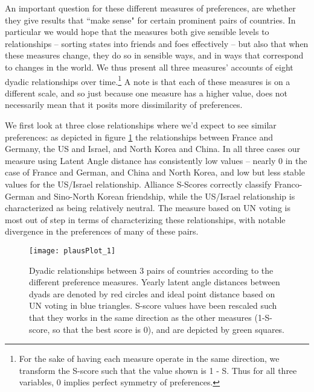 An important question for these different measures of preferences, are whether they give results that ``make sense" for certain prominent pairs of countries. In particular we would hope that the measures both give sensible levels to relationships -- sorting states into friends and foes effectively -- but also that when these measures change, they do so in sensible ways, and in ways that correspond to changes in the world. We thus present all three measures' accounts of eight dyadic relationships over time.\footnote{For the sake of having each measure operate in the same direction, we transform the S-score such that the value shown is 1 - S. Thus for all three variables, $0$ implies perfect symmetry of preferences.} A note is that each of these measures is on a different scale, and so just because one measure has a higher value, does not necessarily mean that it posits more dissimilarity of preferences.

We first look at three close relationships where we'd expect to see similar preferences: as depicted in figure \ref{friendly:dyads} the relationships between France and Germany, the US and Israel, and North Korea and China. In all three cases our measure using Latent Angle distance has consistently low values -- nearly $0$ in the case of France and German, and China and North Korea, and low but less stable values for the US/Israel relationship. Alliance S-Scores correctly classify Franco-German and Sino-North Korean friendship, while the US/Israel relationship is characterized as being relatively neutral. The measure based on UN voting is most out of step in terms of characterizing these relationships, with notable divergence in the preferences of many of these pairs.

\begin{figure}
	\centering
	\texttt{[image: plausPlot\_1]}
	\caption{Dyadic relationships between 3 pairs of countries according to the different preference measures. Yearly latent angle distances between dyads are denoted by red circles and ideal point distance based on UN voting in blue triangles. S-score values have been rescaled such that they works in the same direction as the other measures (1-S-score, so that the best score is 0), and are depicted by green squares.}
	\label{friendly:dyads}
\end{figure}

